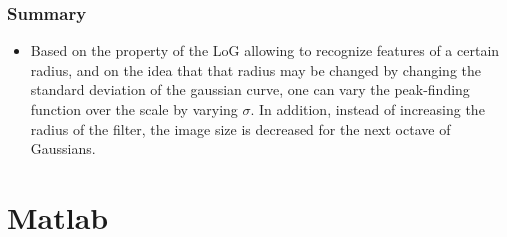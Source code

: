 \documentclass[10pt,a4paper]{scrartcl}
\begin{document}
\begin{multicols*}{2}
\subsubsection{Summary}

\begin{itemize}
\item Based on the property of the LoG allowing to recognize features of a certain radius, and on the idea that that radius may be changed by changing the standard deviation of the gaussian curve, one can vary the peak-finding function over the scale by varying $\sigma$. In addition, instead of increasing the radius of the filter, the image size is decreased for the next octave of Gaussians.
\end{itemize}

\section{Matlab}

%
%
%

\end{multicols*}
\end{document}
